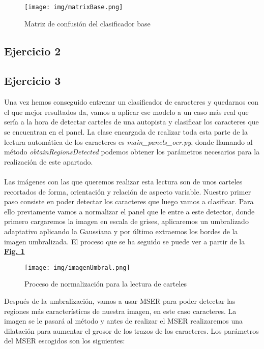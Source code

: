 \documentclass[a4paper, 12pt]{article}
\begin{document}
\begin{figure}[h]
	\centering
	\texttt{[image: img/matrixBase.png]}
 	\caption{Matriz de confusión del clasificador base}\vspace{0.5cm}
	\label{fig:normalizacion}
\end{figure}


\subsection{Ejercicio 2}

\subsection{Ejercicio 3}
Una vez hemos conseguido entrenar un clasificador de caracteres y quedarnos con el que mejor resultados da, vamos a aplicar ese modelo a un caso más real que sería a la hora de detectar carteles de una autopista y clasificar los caracteres que se encuentran en el panel. La clase encargada de realizar toda esta parte de la lectura automática de los caracteres es \textit{main\_panels\_ocr.py}, donde llamando al método \textit{obtainRegionsDetected} podemos obtener los parámetros necesarios para la realización de este apartado. \\\\
Las imágenes con las que queremos realizar esta lectura son de unos carteles recortados de forma, orientación y relación de aspecto variable. Nuestro primer paso consiste en poder detectar los caracteres que luego vamos a clasificar. Para ello previamente vamos a normalizar el panel que le entre a este detector, donde primero cargaremos la imagen en escala de grises, aplicaremos un umbralizado adaptativo aplicando la Gaussiana y por último extraemos los bordes de la imagen umbralizada. El proceso que se ha seguido se puede ver a partir de la \textbf{\hyperref[fig:normalizacion]{Fig. 1}}
\newpage
\begin{figure}[h]
	\centering
	\texttt{[image: img/imagenUmbral.png]}
 	\caption{Proceso de normalización para la lectura de carteles}\vspace{0.5cm}
	\label{fig:normalizacion}
\end{figure}
Después de la umbralización, vamos a usar MSER para poder detectar las regiones más características de nuestra imagen, en este caso caracteres. La imagen se le pasará al método y antes de realizar el MSER realizaremos una dilatación para aumentar el grosor de los trazos de los caracteres. Los parámetros del MSER escogidos son los siguientes:
\end{document}
